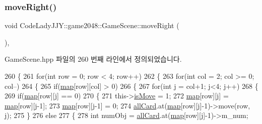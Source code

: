 \subsubsection{\texorpdfstring{move\+Right()}{moveRight()}}
{\footnotesize\ttfamily void Code\+Lady\+J\+J\+Y\+::game2048\+::\+Game\+Scene\+::move\+Right (\begin{DoxyParamCaption}{ }\end{DoxyParamCaption})\hspace{0.3cm}{\ttfamily [inline]}, {\ttfamily [private]}}



Game\+Scene.\+hpp 파일의 260 번째 라인에서 정의되었습니다.


\begin{DoxyCode}
260                     \{
261     \textcolor{keywordflow}{for}(\textcolor{keywordtype}{int} row = 0; row < 4; row++)
262     \{
263         \textcolor{keywordflow}{for}(\textcolor{keywordtype}{int} col = 2; col >= 0; col--)
264         \{
265             \textcolor{keywordflow}{if}(\hyperlink{class_code_lady_j_j_y_1_1game2048_1_1_game_scene_a4d8924d645182d1e2f6b44390e4101ea}{map}[row][col] > 0)
266             \{
267                 \textcolor{keywordflow}{for}(\textcolor{keywordtype}{int} j = col+1; j<4; j++)
268                 \{
269                     \textcolor{keywordflow}{if}(\hyperlink{class_code_lady_j_j_y_1_1game2048_1_1_game_scene_a4d8924d645182d1e2f6b44390e4101ea}{map}[row][j] == 0)
270                     \{
271                         this->\hyperlink{class_code_lady_j_j_y_1_1game2048_1_1_game_scene_a72716d8ae260804ce013766cf4ad1505}{isMove} = 1;
272                         \hyperlink{class_code_lady_j_j_y_1_1game2048_1_1_game_scene_a4d8924d645182d1e2f6b44390e4101ea}{map}[row][j] = \hyperlink{class_code_lady_j_j_y_1_1game2048_1_1_game_scene_a4d8924d645182d1e2f6b44390e4101ea}{map}[row][j-1];
273                         \hyperlink{class_code_lady_j_j_y_1_1game2048_1_1_game_scene_a4d8924d645182d1e2f6b44390e4101ea}{map}[row][j-1] = 0;
274                         \hyperlink{class_code_lady_j_j_y_1_1game2048_1_1_game_scene_aadcd54235c70f1d794213f50f429437f}{allCard}.at(\hyperlink{class_code_lady_j_j_y_1_1game2048_1_1_game_scene_a4d8924d645182d1e2f6b44390e4101ea}{map}[row][j]-1)->move(row, j);
275                     \}
276                     \textcolor{keywordflow}{else}
277                     \{
278                         \textcolor{keywordtype}{int} numObj = \hyperlink{class_code_lady_j_j_y_1_1game2048_1_1_game_scene_aadcd54235c70f1d794213f50f429437f}{allCard}.at(\hyperlink{class_code_lady_j_j_y_1_1game2048_1_1_game_scene_a4d8924d645182d1e2f6b44390e4101ea}{map}[row][j]-1)->m\_num;

\end{DoxyCode}
